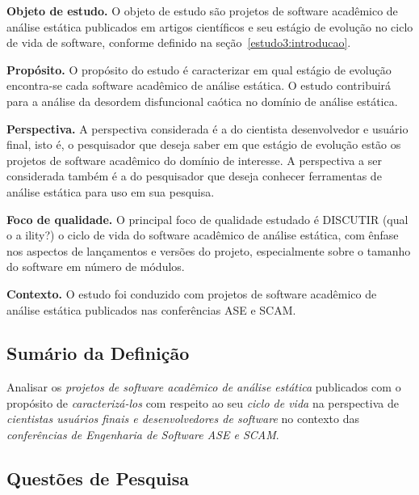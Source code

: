 \begin{description}

  \item{\bf Objeto de estudo.}
    O objeto de estudo são projetos de software acadêmico de análise estática
    publicados em artigos científicos e seu estágio de evolução no ciclo de
    vida de software, conforme definido na seção~\ref{estudo3:introducao}.

  \item{\bf Propósito.}
    O propósito do estudo é caracterizar em qual estágio de evolução
    encontra-se cada software acadêmico de análise estática. O estudo
    contribuirá para a análise da desordem disfuncional caótica no domínio de
    análise estática. 

  \item{\bf Perspectiva.}
    A perspectiva considerada é a do cientista desenvolvedor e usuário final, isto é, o pesquisador
    que deseja saber em que estágio de evolução estão os projetos de software acadêmico do domínio
    de interesse. A perspectiva a ser considerada também é a do pesquisador que deseja
    conhecer ferramentas de análise estática para uso em sua pesquisa.

  \item{\bf Foco de qualidade.}
    O principal foco de qualidade estudado é  DISCUTIR (qual o a ility?) o ciclo de vida do software
    acadêmico de análise estática, com ênfase nos aspectos de lançamentos e
    versões do projeto, especialmente sobre o tamanho do software em número de
    módulos.

  \item{\bf Contexto.}
    O estudo foi conduzido com projetos de software acadêmico de análise
    estática publicados nas conferências ASE e SCAM.

\end{description}

\subsection{Sumário da Definição}

Analisar os \textit{projetos de software acadêmico de análise estática} publicados
com o propósito de \textit{caracterizá-los}
com respeito ao seu \textit{ciclo de vida}  %
na perspectiva de \textit{cientistas usuários finais e desenvolvedores de software}
no contexto das \textit{conferências de Engenharia de Software ASE e SCAM}.

\subsection{Questões de Pesquisa}

